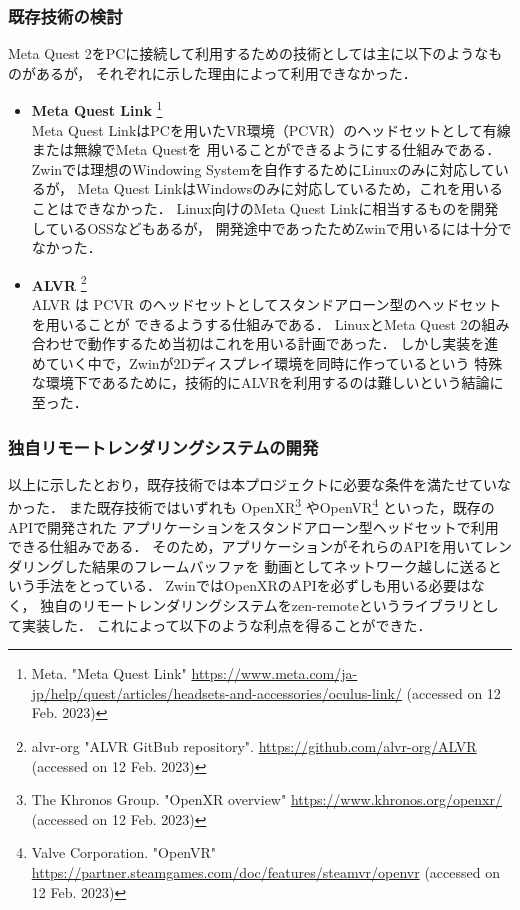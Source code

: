 \subsubsection{既存技術の検討}
\label{subsubsection:exsiting-technology}

Meta Quest 2をPCに接続して利用するための技術としては主に以下のようなものがあるが，
それぞれに示した理由によって利用できなかった．

\begin{itemize}
  \item \textbf{Meta Quest Link}
        \footnote{Meta. "Meta Quest Link"
          \url{https://www.meta.com/ja-jp/help/quest/articles/headsets-and-accessories/oculus-link/}
          (accessed on 12 Feb. 2023)} \\
        Meta Quest LinkはPCを用いたVR環境（PCVR）のヘッドセットとして有線または無線でMeta Questを
        用いることができるようにする仕組みである．
        Zwinでは理想のWindowing Systemを自作するためにLinuxのみに対応しているが，
        Meta Quest LinkはWindowsのみに対応しているため，これを用いることはできなかった．
        Linux向けのMeta Quest Linkに相当するものを開発しているOSSなどもあるが，
        開発途中であったためZwinで用いるには十分でなかった．
  \item \textbf{ALVR}
        \footnote{alvr-org "ALVR GitBub repository". \url{https://github.com/alvr-org/ALVR} (accessed on 12 Feb. 2023)} \\
        ALVR は PCVR のヘッドセットとしてスタンドアローン型のヘッドセットを用いることが
        できるようする仕組みである．
        LinuxとMeta Quest 2の組み合わせで動作するため当初はこれを用いる計画であった．
        しかし実装を進めていく中で，Zwinが2Dディスプレイ環境を同時に作っているという
        特殊な環境下であるために，技術的にALVRを利用するのは難しいという結論に至った．
\end{itemize}

\subsubsection{独自リモートレンダリングシステムの開発}

以上に示したとおり，既存技術では本プロジェクトに必要な条件を満たせていなかった．
また既存技術ではいずれも
OpenXR\footnote{The Khronos Group. "OpenXR overview" \url{https://www.khronos.org/openxr/} (accessed on 12 Feb. 2023)}
やOpenVR\footnote{Valve Corporation. "OpenVR" \url{https://partner.steamgames.com/doc/features/steamvr/openvr} (accessed on 12 Feb. 2023)}
といった，既存のAPIで開発された
アプリケーションをスタンドアローン型ヘッドセットで利用できる仕組みである．
そのため，アプリケーションがそれらのAPIを用いてレンダリングした結果のフレームバッファを
動画としてネットワーク越しに送るという手法をとっている．
ZwinではOpenXRのAPIを必ずしも用いる必要はなく，
独自のリモートレンダリングシステムをzen-remoteというライブラリとして実装した．
これによって以下のような利点を得ることができた．

